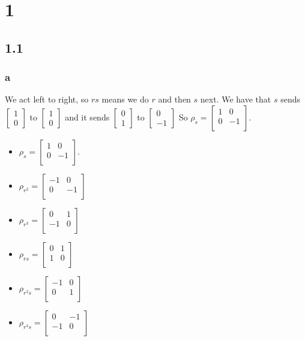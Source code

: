 \documentclass[]{article}
\begin{document}
\section*{1}
\subsection*{1.1}
\subsubsection{a}
We act left to right, so $rs$ means we do $r$ and then $s$ next.
We have that $s$ sends $
\begin{bmatrix}
	1\\
	0
\end{bmatrix}
$
to 
$
\begin{bmatrix}
	1\\
	0
\end{bmatrix}
$
and it sends 
$
\begin{bmatrix}
	0\\
	1
\end{bmatrix}
$
to
$
\begin{bmatrix}
	0\\
	-1
\end{bmatrix}
$
So $\rho_s =
\begin{bmatrix}
	1 & 0 \\
	0 & -1\\
\end{bmatrix}
$.
\begin{itemize}
	\item $\rho_s =
	\begin{bmatrix}
		1 & 0 \\
		0 & -1\\
	\end{bmatrix}
	$.
	\item $\rho_{r^2} = 
	\begin{bmatrix}
		-1 & 0 \\
		0 & -1\\
	\end{bmatrix}
	$
	\item $\rho_{r^3} = 
	\begin{bmatrix}
		0 & 1 \\
		-1 & 0\\
	\end{bmatrix}
	$
	\item $\rho_{rs} = 
	\begin{bmatrix}
		0 & 1 \\
		1 & 0\\
	\end{bmatrix}
	$
	\item $\rho_{r^2s} = 
	\begin{bmatrix}
		-1 & 0 \\
		0 & 1\\
	\end{bmatrix}
	$
	\item $\rho_{r^3s} = 
	\begin{bmatrix}
		0 & -1 \\
		-1 & 0\\
	\end{bmatrix}
	$
\end{itemize}
\end{document}
